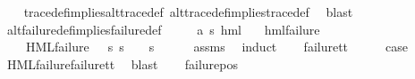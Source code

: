 \begin{isabellebody}
%
\isadelimproof
\ \ %
\endisadelimproof
%
\isatagproof
{}\isamarkupfalse%
\ trace{\isacharunderscore}{\kern0pt}def{\isacharunderscore}{\kern0pt}implies{\isacharunderscore}{\kern0pt}alt{\isacharunderscore}{\kern0pt}trace{\isacharunderscore}{\kern0pt}def\ alt{\isacharunderscore}{\kern0pt}trace{\isacharunderscore}{\kern0pt}def{\isacharunderscore}{\kern0pt}implies{\isacharunderscore}{\kern0pt}trace{\isacharunderscore}{\kern0pt}def\ \isamarkupfalse%
\ blast{\isacharplus}{\kern0pt}%
\endisatagproof
{\isafoldproof}%
%
\isadelimproof
\isanewline
%
\endisadelimproof
\isanewline
{}\isamarkupfalse%
\ alt{\isacharunderscore}{\kern0pt}failure{\isacharunderscore}{\kern0pt}def{\isacharunderscore}{\kern0pt}implies{\isacharunderscore}{\kern0pt}failure{\isacharunderscore}{\kern0pt}def{\isacharcolon}{\kern0pt}\isanewline
\ \ \ {\isasymphi}\ {\isacharcolon}{\kern0pt}{\isacharcolon}{\kern0pt}\ {\isachardoublequoteopen}{\isacharparenleft}{\kern0pt}{\isacharprime}{\kern0pt}a{\isacharcomma}{\kern0pt}\ {\isacharprime}{\kern0pt}s{\isacharparenright}{\kern0pt}\ hml{\isachardoublequoteclose}\isanewline
\ \ \ {\isachardoublequoteopen}hml{\isacharunderscore}{\kern0pt}failure\ {\isasymphi}{\isachardoublequoteclose}\isanewline
\ \ \ {\isachardoublequoteopen}{\isasymexists}{\isasympsi}{\isachardot}{\kern0pt}\ HML{\isacharunderscore}{\kern0pt}failure\ {\isasympsi}\ {\isasymand}\ {\isacharparenleft}{\kern0pt}{\isasymforall}s{\isachardot}{\kern0pt}\ {\isacharparenleft}{\kern0pt}s\ {\isasymTurnstile}\ {\isasymphi}{\isacharparenright}{\kern0pt}\ {\isasymlongleftrightarrow}\ {\isacharparenleft}{\kern0pt}s\ {\isasymTurnstile}\ {\isasympsi}{\isacharparenright}{\kern0pt}{\isacharparenright}{\kern0pt}{\isachardoublequoteclose}\isanewline
%
\isadelimproof
\ \ %
\endisadelimproof
%
\isatagproof
{}\isamarkupfalse%
\ assms\ \isamarkupfalse%
\ induct\isanewline
\ \ \isamarkupfalse%
\ failure{\isacharunderscore}{\kern0pt}tt\isanewline
\ \ \isamarkupfalse%
\ \isamarkupfalse%
\ {\isacharquery}{\kern0pt}case\ \isanewline
\ \ \ \ \isamarkupfalse%
\ HML{\isacharunderscore}{\kern0pt}failure{\isachardot}{\kern0pt}failure{\isacharunderscore}{\kern0pt}tt\ \isamarkupfalse%
\ blast\isanewline
{}\isamarkupfalse%
\isanewline
\ \ \isamarkupfalse%
\ {\isacharparenleft}{\kern0pt}failure{\isacharunderscore}{\kern0pt}pos\ {\isasymphi}\ {\isasymalpha}{\isacharparenright}{\kern0pt}\isanewline

\end{isabellebody}
